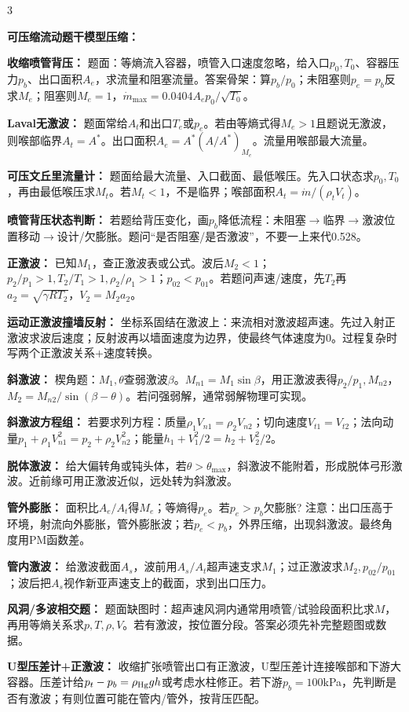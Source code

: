 \documentclass[a4paper]{article}
\newcommand{\sect}[1]{\par{\bfseries\color{Q}#1：}}
\begin{document}
\begin{multicols}{3}
{\sect{可压缩流动题干模型压缩}
\sect{收缩喷管背压}
题面：等熵流入容器，喷管入口速度忽略，给入口$p_0,T_0$、容器压力$p_b$、出口面积$A_e$，求流量和阻塞流量。答案骨架：算$p_b/p_0$；未阻塞则$p_e=p_b$反求$M_e$；阻塞则$M_e=1$，$\dot m_{\max}=0.0404A_ep_0/\sqrt{T_0}$。
\sect{Laval无激波}
题面常给$A_t$和出口$T_e$或$p_e$。若由等熵式得$M_e>1$且题说无激波，则喉部临界$A_t=A^*$。出口面积$A_e=A^*(A/A^*)_{M_e}$。流量用喉部最大流量。
\sect{可压文丘里流量计}
题面给最大流量、入口截面、最低喉压。先入口状态求$p_0,T_0$，再由最低喉压求$M_t$。若$M_t<1$，不是临界；喉部面积$A_t=\dot m/(\rho_tV_t)$。
\sect{喷管背压状态判断}
若题给背压变化，画$p_b$降低流程：未阻塞$\to$临界$\to$激波位置移动$\to$设计/欠膨胀。题问“是否阻塞/是否激波”，不要一上来代0.528。
\sect{正激波}
已知$M_1$，查正激波表或公式。波后$M_2<1$；$p_2/p_1>1,T_2/T_1>1,\rho_2/\rho_1>1$；$p_{02}<p_{01}$。若题问声速/速度，先$T_2$再$a_2=\sqrt{\gamma RT_2}$，$V_2=M_2a_2$。
\sect{运动正激波撞墙反射}
坐标系固结在激波上：来流相对激波超声速。先过入射正激波求波后速度；反射波再以墙面速度为边界，使最终气体速度为0。过程复杂时写两个正激波关系+速度转换。
\sect{斜激波}
楔角题：$M_1,\theta$查弱激波$\beta$。$M_{n1}=M_1\sin\beta$，用正激波表得$p_2/p_1,M_{n2}$，$M_2=M_{n2}/\sin(\beta-\theta)$。若问强弱解，通常弱解物理可实现。
\sect{斜激波方程组}
若要求列方程：质量$\rho_1V_{n1}=\rho_2V_{n2}$；切向速度$V_{t1}=V_{t2}$；法向动量$p_1+\rho_1V_{n1}^2=p_2+\rho_2V_{n2}^2$；能量$h_1+V_1^2/2=h_2+V_2^2/2$。
\sect{脱体激波}
给大偏转角或钝头体，若$\theta>\theta_{\max}$，斜激波不能附着，形成脱体弓形激波。近前缘可用正激波近似，远处转为斜激波。
\sect{管外膨胀}
面积比$A_e/A_t$得$M_e$；等熵得$p_e$。若$p_e>p_b$欠膨胀? 注意：出口压高于环境，射流向外膨胀，管外膨胀波；若$p_e<p_b$，外界压缩，出现斜激波。最终角度用PM函数差。
\sect{管内激波}
给激波截面$A_s$，波前用$A_s/A_t$超声速支求$M_1$；过正激波求$M_2,p_{02}/p_{01}$；波后把$A_s$视作新亚声速支上的截面，求到出口压力。
\sect{风洞/多波相交题}
题面缺图时：超声速风洞内通常用喷管/试验段面积比求$M$，再用等熵关系求$p,T,\rho,V$。若有激波，按位置分段。答案必须先补完整题图或数据。
\sect{U型压差计+正激波}
收缩扩张喷管出口有正激波，U型压差计连接喉部和下游大容器。压差计给$p_t-p_b=\rho_{\rm Hg}gh$或考虑水柱修正。若下游$p_b=100$kPa，先判断是否有激波；有则位置可能在管内/管外，按背压匹配。

}
\end{multicols}
\end{document}
